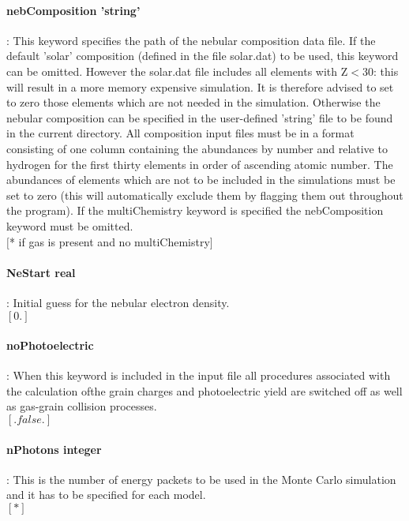 \documentclass[11pt]{article}
\begin{document}
\paragraph   { nebComposition 'string'}: This keyword specifies the path of the nebular 
		     composition data file. If the default 'solar' composition 
		     (defined in the file solar.dat) to be used, this keyword can 
		     be omitted. However the solar.dat file includes all elements 
		     with Z$<$30: this will result in a more memory expensive 
		     simulation. It is therefore advised to set to zero those 
		     elements which are not needed in the simulation. Otherwise the 
		     nebular composition can be specified in the user-defined 'string' 
		     file to be found in the current directory. All composition 
		     input files must be in a format consisting of one column containing 
		     the abundances by number and relative to hydrogen for the first 
		     thirty elements in order of ascending atomic number.
		     The abundances of elements which are not to be included in 
		     the simulations must be set to zero (this will automatically
		     exclude them by flagging them out throughout the program).
		     If the multiChemistry keyword is specified the nebComposition 
		     keyword must be omitted.\\
		     $[$* if gas is present and no multiChemistry$]$\\

\paragraph   { NeStart real   }  : Initial guess for the nebular electron density. \\
		     $[0.]$\\

\paragraph {noPhotoelectric} : When this keyword is included in the input file all procedures associated with the calculation ofthe grain charges and photoelectric yield are switched off as well as gas-grain collision processes. \\
$[.false.]$\\

\paragraph   { nPhotons integer}: This is the number of energy packets to be used in the Monte 
		     Carlo simulation and it has to be specified for each model.\\
		     $[*]$ \\
\end{document}
